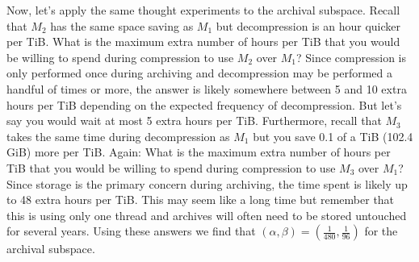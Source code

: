 Now, let's apply the same thought experiments to the archival subspace. Recall
that $M_2$ has the same space saving as $M_1$ but decompression is an hour
quicker per TiB. What is the maximum extra number of hours per TiB that you
would be willing to spend during compression to use $M_2$ over $M_1$? Since
compression is only performed once during archiving and decompression may be
performed a handful of times or more, the answer is likely somewhere between 5
and 10 extra hours per TiB depending on the expected frequency of decompression.
But let's say you would wait at most 5 extra hours per TiB. Furthermore, recall
that $M_3$ takes the same time during decompression as $M_1$ but you save
0.1 of a TiB (102.4 GiB) more per TiB. Again: What is the maximum extra number
of hours per TiB that you would be willing to spend during compression to use
$M_3$ over $M_1$? Since storage is the primary concern during archiving, the
time spent is likely up to 48 extra hours per TiB. This may seem like a long
time but remember that this is using only one thread and archives will often
need to be stored untouched for several years. Using these answers we find that
$(\alpha,\beta)=(\frac{1}{480},\frac{1}{96})$ for the archival subspace.



